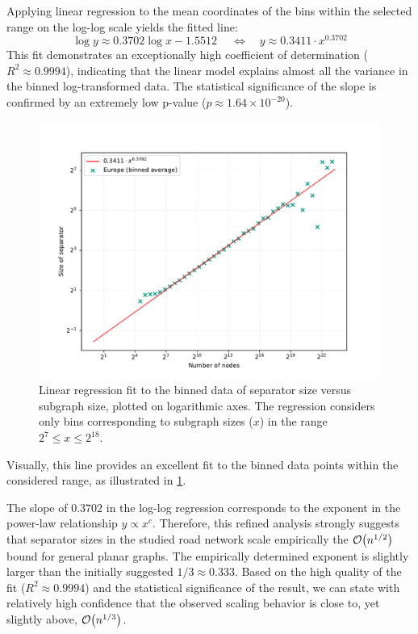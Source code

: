Applying linear regression to the mean coordinates of the bins within the selected range on the log-log scale yields the fitted line:
\[ \log y \approx 0.3702 \log x - 1.5512\ \quad\iff\quad y \approx 0.3411 \cdot x^{0.3702}\]
This fit demonstrates an exceptionally high coefficient of determination (\( R^2 \approx 0.9994 \)), indicating that the linear model explains almost all the variance in the binned log-transformed data.
The statistical significance of the slope is confirmed by an extremely low p-value (\( p \approx 1.64 \times 10^{-20} \)).

\begin{figure}
    \centering
    \includegraphics[width=0.7\linewidth]{graphics/EuropeShowFit.pdf}
    \caption{Linear regression fit to the binned data of separator size versus subgraph size, plotted on logarithmic axes. The regression considers only bins corresponding to subgraph sizes (\(x\)) in the range \( 2^7 \le x \le 2^{18} \).}
    \label{fig:separator_size_loglog_fit}
\end{figure}

Visually, this line provides an excellent fit to the binned data points within the considered range, as illustrated in \cref{fig:separator_size_loglog_fit}.

The slope of \( 0.3702 \) in the log-log regression corresponds to the exponent in the power-law relationship \( y \propto x^c \).
Therefore, this refined analysis strongly suggests that separator sizes in the studied road network scale empirically the \( \mathcal{O}\!\left(n^{1/2}\right) \) bound for general planar graphs.
The empirically determined exponent is slightly larger than the initially suggested \( 1/3 \approx 0.333 \).
Based on the high quality of the fit (\( R^2 \approx 0.9994 \)) and the statistical significance of the result, we can state with relatively high confidence that the observed scaling behavior is close to, yet slightly above, \( \mathcal{O}\!\left(n^{1/3}\right) \).

